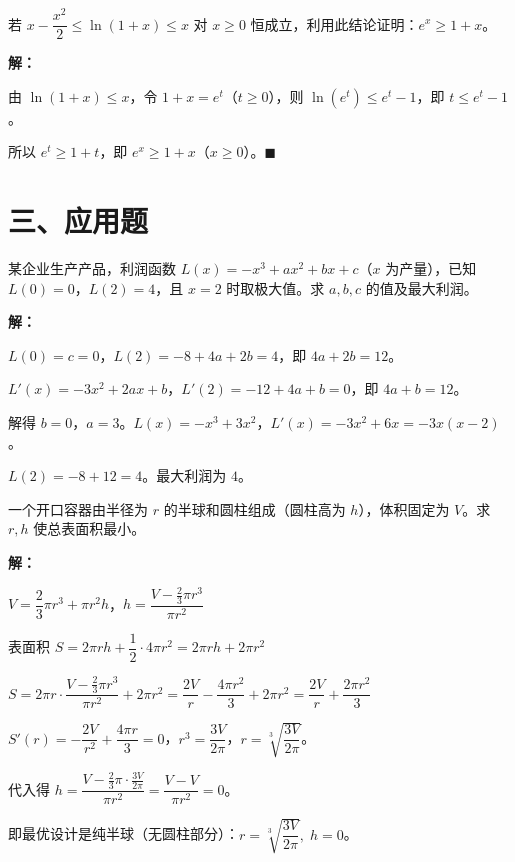 \documentclass[12pt, a4paper]{ctexart}
\begin{document}
\begin{examplebox}
若 $x-\dfrac{x^2}{2}\leq \ln(1+x)\leq x$ 对 $x\geq 0$ 恒成立，利用此结论证明：$e^x\geq 1+x$。

\textbf{解：}

由 $\ln(1+x)\leq x$，令 $1+x=e^t$（$t\geq 0$），则 $\ln(e^t)\leq e^t-1$，即 $t\leq e^t-1$。

所以 $e^t\geq 1+t$，即 $e^x\geq 1+x$（$x\geq 0$）。$\blacksquare$
\end{examplebox}

\section*{\textcolor{apppurple}{三、应用题}}

\begin{appbox}[【应用1】利润最大化]
某企业生产产品，利润函数 $L(x)=-x^3+ax^2+bx+c$（$x$ 为产量），已知 $L(0)=0$，$L(2)=4$，且 $x=2$ 时取极大值。求 $a,b,c$ 的值及最大利润。

\textbf{解：}

$L(0)=c=0$，$L(2)=-8+4a+2b=4$，即 $4a+2b=12$。

$L'(x)=-3x^2+2ax+b$，$L'(2)=-12+4a+b=0$，即 $4a+b=12$。

解得 $b=0$，$a=3$。$L(x)=-x^3+3x^2$，$L'(x)=-3x^2+6x=-3x(x-2)$。

$L(2)=-8+12=4$。最大利润为 $\boxed{4}$。
\end{appbox}

\begin{appbox}[【应用2】最优设计]
一个开口容器由半径为 $r$ 的半球和圆柱组成（圆柱高为 $h$），体积固定为 $V$。求 $r,h$ 使总表面积最小。

\textbf{解：}

$V=\dfrac{2}{3}\pi r^3+\pi r^2 h$，$h=\dfrac{V-\frac{2}{3}\pi r^3}{\pi r^2}$

表面积 $S=2\pi rh+\dfrac{1}{2}\cdot 4\pi r^2=2\pi r h+2\pi r^2$

$S=2\pi r\cdot\dfrac{V-\frac{2}{3}\pi r^3}{\pi r^2}+2\pi r^2=\dfrac{2V}{r}-\dfrac{4\pi r^2}{3}+2\pi r^2=\dfrac{2V}{r}+\dfrac{2\pi r^2}{3}$

$S'(r)=-\dfrac{2V}{r^2}+\dfrac{4\pi r}{3}=0$，$r^3=\dfrac{3V}{2\pi}$，$r=\sqrt[3]{\dfrac{3V}{2\pi}}$。

代入得 $h=\dfrac{V-\frac{2}{3}\pi\cdot\frac{3V}{2\pi}}{\pi r^2}=\dfrac{V-V}{\pi r^2}=0$。

即最优设计是纯半球（无圆柱部分）：$\boxed{r=\sqrt[3]{\dfrac{3V}{2\pi}},\; h=0}$。
\end{appbox}
\end{document}
